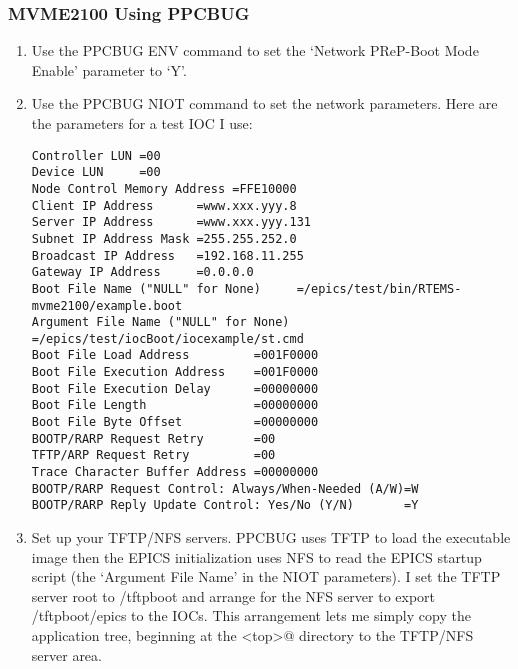 \documentclass{report}
\begin{document}
\subsubsection{MVME2100 Using PPCBUG}
\begin{enumerate}
\item Use the PPCBUG ENV command to set the `Network PReP-Boot Mode Enable'
parameter to `Y'.
\item Use the PPCBUG NIOT command to set the network parameters.  Here are the
parameters for a test IOC I use:
\begin{verbatim}
Controller LUN =00
Device LUN     =00
Node Control Memory Address =FFE10000
Client IP Address      =www.xxx.yyy.8
Server IP Address      =www.xxx.yyy.131
Subnet IP Address Mask =255.255.252.0
Broadcast IP Address   =192.168.11.255
Gateway IP Address     =0.0.0.0
Boot File Name ("NULL" for None)     =/epics/test/bin/RTEMS-mvme2100/example.boot
Argument File Name ("NULL" for None) =/epics/test/iocBoot/iocexample/st.cmd
Boot File Load Address         =001F0000
Boot File Execution Address    =001F0000
Boot File Execution Delay      =00000000
Boot File Length               =00000000
Boot File Byte Offset          =00000000
BOOTP/RARP Request Retry       =00
TFTP/ARP Request Retry         =00
Trace Character Buffer Address =00000000
BOOTP/RARP Request Control: Always/When-Needed (A/W)=W
BOOTP/RARP Reply Update Control: Yes/No (Y/N)       =Y
\end{verbatim}
\item Set up your TFTP/NFS servers.  PPCBUG uses TFTP
to load the executable image then the EPICS initialization uses
NFS to read the EPICS startup script (the `Argument File Name' in the NIOT
parameters).
I set the TFTP server root to /tftpboot and arrange for the NFS server to
export /tftpboot/epics to the IOCs.  This arrangement lets me simply copy the
application tree, beginning at the \verb@<top>@ directory to the TFTP/NFS server area.
\end{enumerate}
\end{document}
